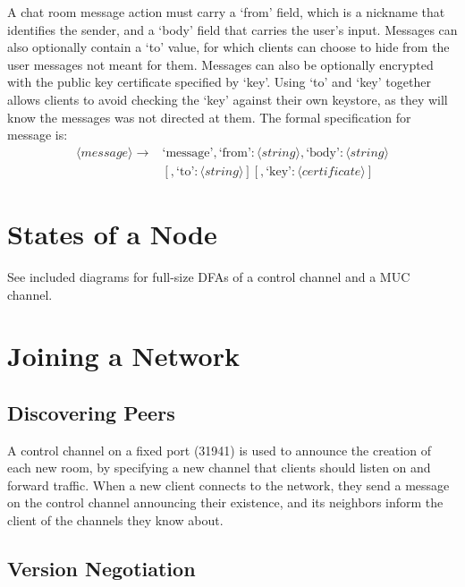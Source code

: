 \documentclass{article}
\begin{document}
A chat room message action must carry a `from' field, which is a nickname that
identifies the sender, and a `body' field that carries the user's input.
Messages can also optionally contain a `to' value, for which clients can choose
to hide from the user messages not meant for them. Messages can also be
optionally encrypted with the public key certificate specified by `key'. Using
`to' and `key' together allows clients to avoid checking the `key' against their
own keystore, as they will know the messages was not directed at them. The
formal specification for message is:
\begin{align*}
\langle message\rangle  \rightarrow& \text{`message'} , \text{`from'} : \langle
string\rangle  , \text{`body'} : \langle string\rangle \\
&[ , \text{`to'} :
\langle string\rangle  ] [ , \text{`key'}: \langle certificate\rangle  ]
\end{align*}
\section{States of a Node}
See included diagrams for full-size DFAs of a control channel and a MUC channel.
\begin{center}
\scalebox{.38}{

}
\end{center}

\begin{center}
\scalebox{.38}{

}
\end{center}
\section{Joining a Network}

\subsection{Discovering Peers}

A control channel on a fixed port (31941) is used to announce the creation of
each new room, by specifying a new channel that clients should listen on and
forward traffic. When a new client connects to the network, they send a message
on the control channel announcing their existence, and its neighbors inform the
client of the channels they know about.

\subsection{Version Negotiation}
\end{document}
